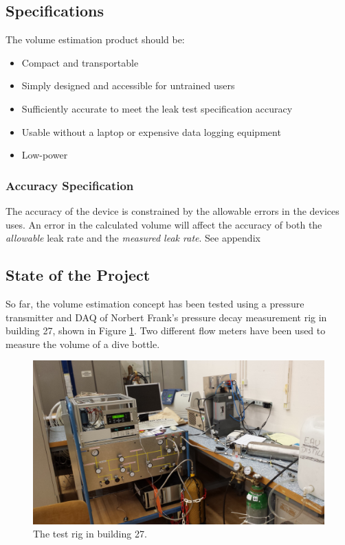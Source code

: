 \documentclass{report}
\begin{document}
\subsection{Specifications}
The volume estimation product should be:

\begin{itemize}
	\item{Compact and transportable}
	\item{Simply designed and accessible for untrained users}
	\item{Sufficiently accurate to meet the leak test specification accuracy}
	\item{Usable without a laptop or expensive data logging equipment}
	\item{Low-power}
\end{itemize}

\subsubsection{Accuracy Specification}
The accuracy of the device is constrained by the allowable errors in the devices uses. An error in the calculated volume will affect the accuracy of both the \textit{allowable} leak rate and the \textit{measured leak rate}. See appendix %
	
\subsection{State of the Project}
So far, the volume estimation concept has been tested using a pressure transmitter and DAQ of Norbert Frank's pressure decay measurement rig in building 27, shown in Figure \ref{b27}. Two different flow meters have been used to measure the volume of a dive bottle. 
\begin{figure}[h] \label{b27}
\includegraphics[width = \textwidth]{wide}
\caption{The test rig in building 27.}
\end{figure}
\end{document}
